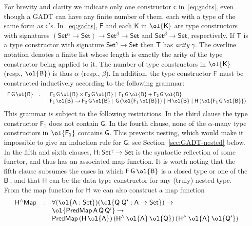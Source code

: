 \documentclass[sigplan,screen]{acmart}
\begin{document}
\noindent
For brevity and clarity we indicate only one constructor $\mathsf{c}$
in~\eqref{eq:gadts}, even though a GADT can have any finite number of
them, each with a type of the same form as
$\mathsf{c}$'s. In~\eqref{eq:gadts}, $\mathsf{F}$ and each
$\mathsf{K}$ in $\ol{\mathsf{K}}$ are type constructors with
signatures $\mathsf{(Set^{\alpha} \to Set) \to Set^{\beta} \to Set}$
and $\mathsf{Set^{\beta} \to Set}$, respectively. If $\mathsf{T}$ is a
type constructor with signature $\mathsf{Set^{\gamma} \to Set}$ then
$\mathsf{T}$ has {\em arity} $\mathsf{\gamma}$.  The
overline notation denotes a finite list whose length is exactly the
arity of the type constructor being applied to it. The number of type
constructors in $\ol{\mathsf{K}}$ (resp., $\ol{\mathsf{B}}$) is thus
$\alpha$ (resp., $\beta$). In addition, the type constructor
$\mathsf{F}$ must be constructed inductively according to the
following grammar:\label{grammar}
\[\begin{array}{lll}
\mathsf{F\,G\,\ol{B}} & := &
\mathsf{F_1\,G\,\ol{B} \times F_2\,G\,\ol{B} \ \vert\ F_1\,G\,\ol{B} +
  F_2\,G\,\ol{B}}\\
& & \!\!\!\!\mathsf{\vert\ F_1\,\ol{B} \to F_2\,G\,\ol{B}
\ \vert\ G\,(\ol{F_1\,\ol{B}}) \ \vert\ H\,\ol{B} \ \vert\ H\,
(\ol{F_1\,G\,\ol{B}}) }
\end{array}\]
This grammar is subject to the following restrictions. In the third
clause the type constructor $\mathsf{F_1}$ does not contain
$\mathsf{G}$. In the fourth clause, none of the $\mathsf{\alpha}$-many
type constructors in $\mathsf{\ol{F_1}}$ contains $\mathsf{G}$. This
prevents nesting, which would make it impossible to give an induction
rule for $\mathsf{G}$; see Section~\ref{sec:GADT-nested} below. In the
fifth and sixth clauses, $\mathsf{H : Set^\gamma \to Set}$ is the
syntactic reflection of some functor, and thus has an associated map
function. It is worth noting that the fifth clause subsumes the cases
in which $\mathsf{F\,G\,\ol{B}}$ is a closed type or one of the
$\mathsf{B_i}$, and that $\mathsf{H}$ can be the data type constructor
for any (truly) nested type. From the map function for $\mathsf{H}$ we
can also construct a map function
\begin{equation}\label{eq:hliftmap}
\begin{array}{lll}
\mathsf{H^\wedge Map} & : & \mathsf{\forall (\ol{A : Set}) (\ol{Q\;Q'
    : A \to Set}) \to}\\
& & \mathsf{\ol{PredMap\,A\,Q\,Q'} \to}\\
& & \mathsf{PredMap\,(H\,\ol{A})\,(H^{\wedge}\,\ol{A}\,\ol{Q})\, 
(H^{\wedge}\,\ol{A}\,\ol{Q'})}
\end{array}
\end{equation}
\end{document}
